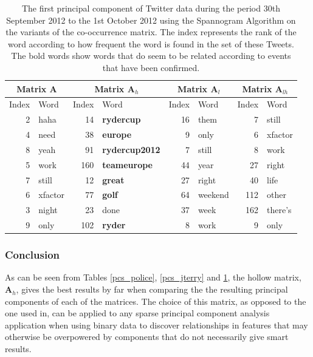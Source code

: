 \documentclass[11pt,a4paper]{article}
\newcommand{\covmat}{\mathbf{A}}
\begin{document}
\begin{table}[H]
\center
\begin{tabular}{| r | l | r | l| r | l | r | l|}
\hline
\multicolumn{2}{|c|}{Matrix $\covmat$ }& \multicolumn{2}{|c|}{Matrix $\covmat_h$}& \multicolumn{2}{|c|}{Matrix $\covmat_l$} & \multicolumn{2}{|c|}{Matrix $\covmat_{lh}$} \\

\hline
Index & Word &Index & Word & Index & Word & Index & Word\\
\hline
2 & haha & 14 & \textbf{rydercup} & 16 & them& 7 & still\\
4 & need  & 38 & \textbf{europe} & 9 & only &  6 & xfactor\\
8 & yeah &91 & \textbf{rydercup2012}& 7 & still  & 8 & work \\

5 & work & 160 & \textbf{teameurope}&44 & year  & 27 & right \\

7 & still &  12 & \textbf{great}&27 & right   & 40 & life\\

6 & xfactor & 77 & \textbf{golf}  &64& weekend & 112 & other  \\ 

3 & night &23 & done & 37 & week & 162 & there's\\
 
9 & only & 102 & \textbf{ryder}  & 8 & work & 9 & only\\

\hline
\end{tabular}
\label{pcs_ryder}
\caption{The first principal component of Twitter data during the period 30th September 2012 to the 1st October 2012 using the Spannogram Algorithm on the variants of the co-occurrence matrix. The index represents the rank of the word according to how frequent the word is found in the set of these Tweets. The bold words show words that do seem to be related according to events that have been confirmed.}
\end{table}

\subsubsection*{Conclusion}
As can be seen from Tables \ref{pcs_police}, \ref{pcs_jterry} and \ref{pcs_ryder}, the hollow matrix, $\covmat_h$, gives the best results by far when comparing the the resulting principal components of each of the matrices. The choice of this matrix, as opposed to the one used in,\cite{dimakis} can be applied to any sparse principal component analysis application when using binary data to discover relationships in features that may otherwise be overpowered by components that do not necessarily give smart results. 
\end{document}
